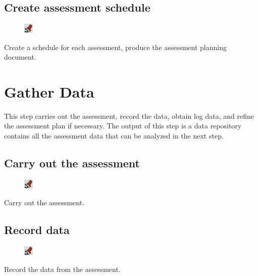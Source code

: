 \documentclass[11pt,oneside]{book}
\begin{document}
\section{Create assessment schedule}
\begin{shadebox}
\begin{figure}
\vspace{-15pt}\hspace{-10pt}
    \includegraphics[width=0.04\textwidth]{note-icon}
\end{figure}
Create a schedule for each assessment, produce the assessment planning document.
\end{shadebox}

\chapter{Gather Data}
This step carries out the assessment, record the data, obtain log data, and refine the assessment plan if necessary. The output of this step is a data repository contains all the assessment data that can be analyzed in the next step.

\section{Carry out the assessment}
\begin{shadebox}
\begin{figure}
\vspace{-15pt}\hspace{-10pt}
    \includegraphics[width=0.04\textwidth]{note-icon}
\end{figure}
Carry out the assessment.
\end{shadebox}

\section{Record data}
\begin{shadebox}
\begin{figure}
\vspace{-15pt}\hspace{-10pt}
    \includegraphics[width=0.04\textwidth]{note-icon}
\end{figure}
Record the data from the assessment.
\end{shadebox}
\end{document}
